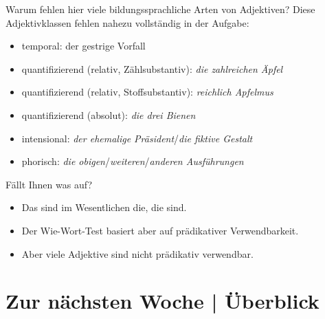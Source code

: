 \begin{frame}
  {Warum fehlen hier viele \alert{bildungssprachliche} Arten von Adjektiven?}
  \pause
  \small
  Diese Adjektivklassen fehlen nahezu vollständig in der Aufgabe:
  \pause
  \begin{itemize}[<+->]
    \item \alert{temporal}: der \alert{gestrige} Vorfall
    \item \alert{quantifizierend} (relativ, Zählsubstantiv): \textit{die \alert{zahlreichen} Äpfel}
    \item \alert{quantifizierend} (relativ, Stoffsubstantiv): \textit{\alert{reichlich} Apfelmus}
    \item \alert{quantifizierend} (absolut): \textit{die \alert{drei} Bienen}
    \item \alert{intensional}: \textit{der \alert{ehemalige} Präsident}\slash\textit{die \alert{fiktive} Gestalt}
    \item \alert{phorisch}: \textit{die \alert{obigen}}/\textit{\alert{weiteren}}/\textit{\alert{anderen} Ausführungen}
  \end{itemize}
  \pause
  \Halbzeile
  Fällt Ihnen was auf?
  \pause
  \begin{itemize}[<+->]
    \item Das sind im Wesentlichen die, die  sind.
    \item Der Wie-Wort-Test basiert aber auf prädikativer Verwendbarkeit.
    \item Aber viele Adjektive sind nicht prädikativ verwendbar. 
  \end{itemize}
\end{frame}

\section{Zur nächsten Woche | Überblick}

